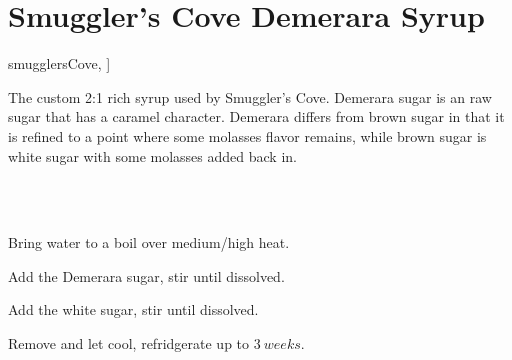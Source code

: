 \section[SC Demerara Syrup]{Smuggler's Cove Demerara Syrup}


\begin{recipestats}[
	servings=$\approx~1\onehalf~Cup$,
	preptime=5~\minute,
	original=\citeauthor{smugglersCove}~\cite[p.~324]{smugglersCove},
]
\end{recipestats}

\begin{recipeabstract}
	The custom 2:1 rich syrup used by Smuggler's Cove.
	Demerara sugar is an raw sugar that has a caramel character.
	Demerara differs from brown sugar in that it is refined to a point where some molasses flavor remains,
		while brown sugar is white sugar with some molasses added back in.
\end{recipeabstract}


\begin{ingredientcolumns}[1]
	\begin{ingredientblock}
		\\
		\\
	\end{ingredientblock}
\end{ingredientcolumns}


\begin{preparation}
\item Bring water to a boil over medium/high heat.
\item Add the Demerara sugar, stir until dissolved.
\item Add the white sugar, stir until dissolved.
\item Remove and let cool, refridgerate up to $3~weeks$.
\end{preparation}


\recipeend

